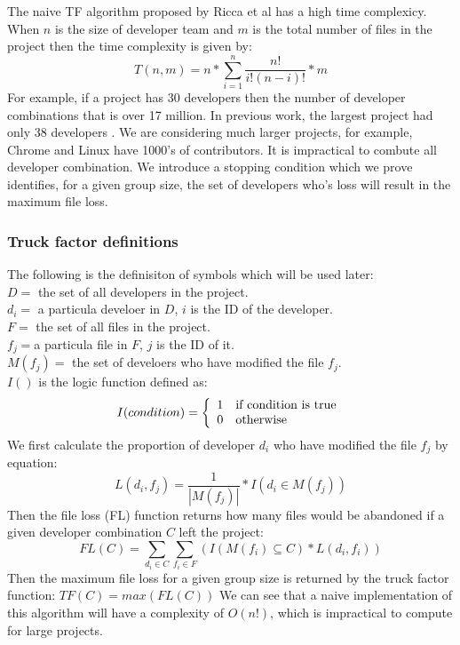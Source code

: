 \documentclass[11pt, a4paper, openright]{report}
\begin{document}
The naive TF algorithm proposed by Ricca et al \cite{Ricca2011PROFES} has a high time complexicy.
When $n$ is the size of developer team and $m$ is the total number of files in the project then the time complexity is given by:
\begin{equation}T(n,m) = n*\sum_{i=1}^n \frac{n!}{i!(n-i)!}*m\end{equation}
For example, if a project has 30 developers then the number of developer combinations that is over 17 million.
In previous work, the largest project had only 38 developers
\cite{Torchiano2011Wetsom}. We are considering much larger projects, for
example, Chrome and Linux have 1000's of contributors. It is impractical to
combute all developer combination.
We introduce a stopping condition which we prove identifies, for a given group size, the set of developers who's loss will result in the maximum file loss.
\subsubsection{Truck factor definitions}
The following is the definisiton of symbols which will be used later:\\
$D =$ the set of all developers in the project.\\ %
$d_{i}=$ a particula develoer in $D$, $i$ is the ID of the developer.\\
$F=$ the set of all files in the project.\\ %
$f_{j}=$a particula file in $F$, $j$ is the ID of it.\\
$M(f_{j})=$ the set of develoers who have modified the file $f_{j}$.\\
$I()$ is the logic function defined as:
\[ I(condition) = \left\{
\begin{array}{l l}
1 & \textmd{if condition is true}\\
0 & \textmd{otherwise}
\end{array} \right.\]
We first calculate the proportion of developer $d_{i}$ who have modified the file $f_{j}$ by equation:
\begin{equation}L(d_{i},f_{j})=\frac{1}{|M(f_{j})|} * I(d_{i} \in M(f_{j} )) \end{equation}
Then the file loss (FL) function returns how many files would be abandoned if a given developer combination $C$ left the project:
\begin{equation}
FL(C) = \sum_{d_i \in C} \sum_{f_i \in F} (I(M(f_i) \subseteq C)* L(d_i,f_i))
\end{equation}
Then the maximum file loss for a given group size is returned by the truck factor function:
$TF(C) = max(FL(C))$
We can see that a naive implementation of this algorithm will have a complexity of $O(n!)$, which is impractical to compute for large projects.
\end{document}
